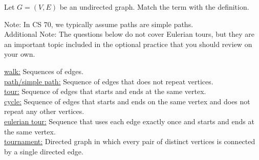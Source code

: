\question Let $G=(V, E)$ be an undirected graph. Match the term with the definition. \newline
\noindent{}

\vspace{3mm}
Note: In CS 70, we typically assume paths are simple paths. \\
Additional Note: The questions below do not cover Eulerian tours, but they are an important topic included in the optional practice that you should review on your own. \\  


\begin{solution} 
\underline{walk:} Sequences of edges.\\
\underline{path/simple path:} Sequence of edges that does not repeat vertices. \\
\underline{tour:} Sequence of edges that starts and ends at the same vertex. \\
\underline{cycle:} Sequence of edges that starts and ends on the same vertex and does not repeat any other vertices. \\
\underline{eulerian tour:} Sequence that uses each edge exactly once and starts and ends at the same vertex. \\
\underline{tournament:} Directed graph in which every pair of distinct vertices is connected by a single directed edge. 
\end{solution}

